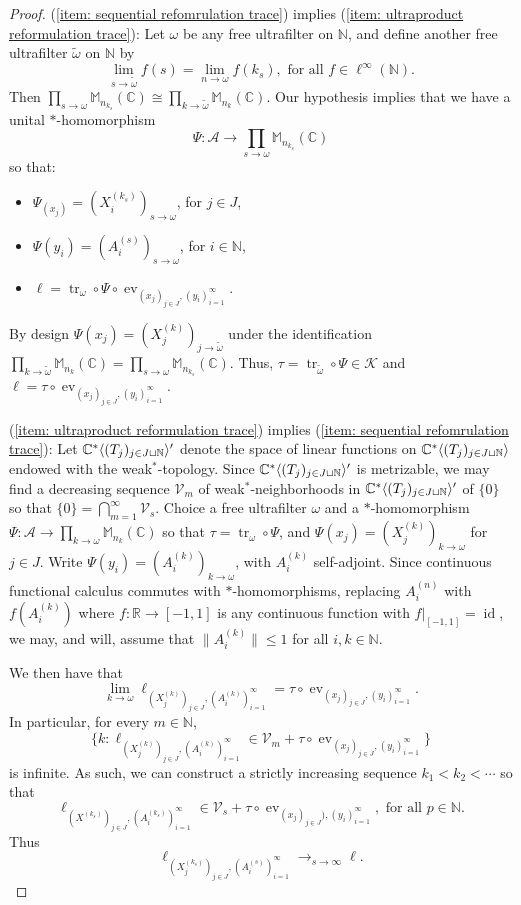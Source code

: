 \documentclass[10pt]{amsart}
\theoremstyle{definition}
\numberwithin{equation}{section}
\newcommand{\bC}{{\mathbb C}}
\newcommand{\bM}{{\mathbb M}}
\newcommand{\bN}{{\mathbb N}}
\newcommand{\bR}{{\mathbb R}}
\newcommand{\cA}{{\mathcal A}}
\newcommand{\cK}{{\mathcal K}}
\newcommand{\cV}{{\mathcal V}}
\DeclareMathOperator{\id}{id}
\DeclareMathOperator{\tr}{tr}
\DeclareMathOperator{\ev}{ev}
\DeclarePairedDelimiter{\ip}{\langle}{\rangle}
\begin{document}
\begin{proof}

(\ref{item: sequential refomrulation trace}) implies (\ref{item: ultraproduct reformulation trace}): Let $\omega$ be any free ultrafilter on $\bN$, and define another free ultrafilter $\widetilde{\omega}$ on $\bN$ by 
\[\lim_{s\to\widetilde{\omega}}f(s)=\lim_{n\to\omega}f(k_{s}), \text{ for all $f\in \ell^{\infty}(\bN).$}\]
Then $\prod_{s\to\omega}\bM_{n_{k_{s}}}(\bC)\cong \prod_{k\to\widetilde{\omega}}\bM_{n_{k}}(\bC)$.
Our hypothesis implies that we have a unital $*$-homomorphism
\[\Psi\colon \cA\to \prod_{s\to\omega} \bM_{n_{k_{s}}}(\bC)\]
so that:
\begin{itemize}
    \item $\Psi_(x_{j})=(X_{i}^{(k_{s})})_{s\to\omega}$, for $j\in J$,
    \item $\Psi(y_{i})=(A_{i}^{(s)})_{s\to\omega}$, for $i\in \bN$,
    \item $\ell=\tr_{\omega}\circ \Psi\circ \ev_{(x_{j})_{j\in J},(y_{i})_{i=1}^{\infty}}$. 
\end{itemize}
By design $\Psi(x_{j})=(X^{(k)}_{j})_{j\to\widetilde{\omega}}$ under the identification $\prod_{k\to\widetilde{\omega}}\bM_{n_{k}}(\bC)=\prod_{s\to\omega}\bM_{n_{k_{s}}}(\bC).$ Thus, $\tau=\tr_{\widetilde{\omega}}\circ \Psi\in \cK$ and $\ell=\tau\circ \ev_{(x_{j})_{j\in J},(y_{i})_{i=1}^{\infty}}$.


(\ref{item: ultraproduct reformulation trace}) implies (\ref{item: sequential refomrulation trace}):
Let $\bC^{*}\ip{(T_{j})_{j\in J\sqcup \bN}}'$ denote the space of linear functions on $\bC^{*}\ip{(T_{j})_{j\in J\sqcup \bN}}$ endowed with the weak$^{*}$-topology. Since $\bC^{*}\ip{(T_{j})_{j\in J\sqcup \bN}}'$ is metrizable,  we may find a decreasing sequence $\cV_{m}$ of weak$^{*}$-neighborhoods in $\bC^{*}\ip{(T_{j})_{j\in J\sqcup \bN}}'$ of $\{0\}$ so that $\{0\}=\bigcap_{m=1}^{\infty}\cV_{s}$. Choice a free ultrafilter $\omega$ and a $*$-homomorphism $\Psi\colon \cA\to \prod_{k\to\omega}\bM_{n_{k}}(\bC)$ so that $\tau=\tr_{\omega}\circ \Psi$, and $\Psi(x_{j})=(X^{(k)}_{j})_{k\to\omega}$ for $j\in J$. Write $\Psi(y_{i})=(A_{i}^{(k)})_{k\to\omega}$, with $A_{i}^{(k)}$ self-adjoint.  Since continuous functional calculus commutes with $*$-homomorphisms, replacing $A_{i}^{(n)}$ with $f(A_{i}^{(k)})$ where $f\colon \bR\to [-1,1]$ is any continuous function with $f|_{[-1,1]}=\id$, we may, and will, assume that $\|A_{i}^{(k)}\|\leq 1$ for all $i,k\in \bN$. 

We then have that 
\[\lim_{k\to\omega}\ell_{(X^{(k)}_{j})_{j\in J},(A^{(k)}_{i})_{i=1}^{\infty}}=\tau\circ \ev_{(x_{j})_{j\in J},(y_{i})_{i=1}^{\infty}}.\]
In particular, for every $m\in \bN$, 
\[\{k:\ell_{(X^{(k)}_{j})_{j\in J},(A_{i}^{(k)})_{i=1}^{\infty}}\in \mathcal{V}_{m}+\tau\circ \ev_{(x_{j})_{j\in J},(y_{i})_{i=1}^{\infty}}\}\]
is infinite. As such, we can construct a strictly increasing sequence $k_{1}<k_{2}<\cdots$ so that 
\[\ell_{(X^{(k_{s})})_{j\in J},(A_{i}^{(k_{s})})_{i=1}^{\infty}}\in \mathcal{V}_{s}+\tau\circ \ev_{(x_{j})_{j\in J}),(y_{i})_{i=1}^{\infty}}, \text{ for all $p\in \bN$.}\]
Thus 
\[\ell_{(X^{(k_{s})}_{j})_{j\in J},(A^{(s)}_{i})_{i=1}^{\infty}}\to_{s\to\infty}\ell.\]




\end{proof}
\end{document}
